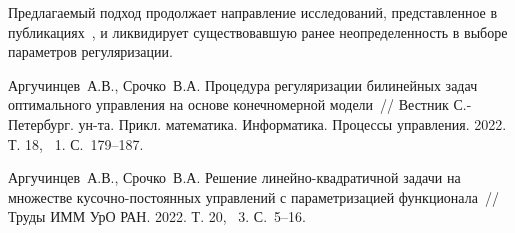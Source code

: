 Предлагаемый подход продолжает направление исследований, представленное в публикациях~\cite{srochko1,srochko2}, и ликвидирует существовавшую ранее неопределенность в выборе параметров регуляризации.


\begin{thebibliography}{9} %
 Аргучинцев~А.В., Срочко~В.А. Процедура регуляризации билинейных задач оптимального управления на основе конечномерной модели~// Вестник С.-Петербург. ун-та. Прикл. математика. Информатика. Процессы управления. 2022. Т. 18, \textnumero~1. С.~179--187.

 Аргучинцев~А.В., Срочко~В.А. Решение линейно-квадратичной задачи на множестве кусочно-постоянных управлений с параметризацией функционала~// Труды ИММ УрО РАН. 2022. Т. 20, \textnumero~3. С.~5--16.

\end{thebibliography}




% 